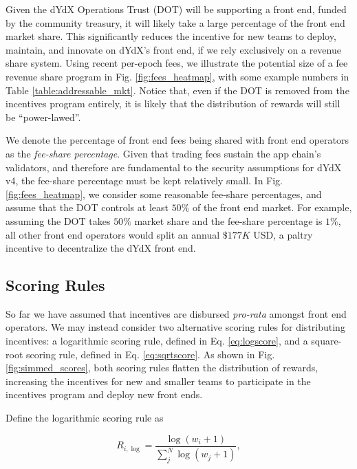         Given the dYdX Operations Trust (DOT) will be supporting a front end, funded by the community treasury, it will likely take a large percentage of the front end market share. This significantly reduces the incentive for new teams to deploy, maintain, and innovate on dYdX's front end, if we rely exclusively on a revenue share system. Using recent per-epoch fees, we illustrate the potential size of a fee revenue share program in Fig. \ref{fig:fees_heatmap}, with some example numbers in Table \ref{table:addressable_mkt}. Notice that, even if the DOT is removed from the incentives program entirely, it is likely that the distribution of rewards will still be ``power-lawed''. 

        We denote the percentage of front end fees being shared with front end operators as the \textit{fee-share percentage}. Given that trading fees sustain the app chain's validators, and therefore are fundamental to the security assumptions for dYdX v4, the fee-share percentage must be kept relatively small. In Fig. \ref{fig:fees_heatmap}, we consider some reasonable fee-share percentages, and assume that the DOT controls at least $50\%$ of the front end market. For example, assuming the DOT takes $50\%$ market share and the fee-share percentage is $1\%$, all other front end operators would split an annual $\$177K$ USD, a paltry incentive to decentralize the dYdX front end.

    \subsection{Scoring Rules}

        So far we have assumed that incentives are disbursed \textit{pro-rata} amongst front end operators. We may instead consider two alternative scoring rules for distributing incentives: a logarithmic scoring rule, defined in Eq. \ref{eq:logscore}, and a square-root scoring rule, defined in Eq. \ref{eq:sqrtscore}. As shown in Fig. \ref{fig:simmed_scores}, both scoring rules flatten the distribution of rewards, increasing the incentives for new and smaller teams to participate in the incentives program and deploy new front ends.

        Define the logarithmic scoring rule as

        \begin{equation} \label{eq:logscore}
            R_{i, \log} = \frac{\log{(w_i + 1)}}{\sum_j^N{\log(w_j + 1)}}, 
        \end{equation}

